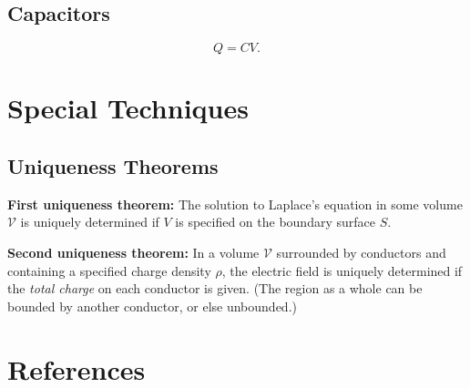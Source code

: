 \documentclass[a4paper]{article}
\numberwithin{equation}{subsection}
\begin{document}
\subsection{Capacitors}

\begin{equation*}
    Q = CV.
\end{equation*}

\medskip
\section{Special Techniques}
\subsection{Uniqueness Theorems}
\textbf{First uniqueness theorem:} The solution to Laplace's equation in some volume $\mathcal{V}$ is uniquely determined if $V$ is specified on the boundary surface $S$.

\textbf{Second uniqueness theorem:} In a volume $\mathcal{V}$ surrounded by conductors and containing a specified charge density $\rho$, the electric field is uniquely determined if the \textit{total charge} on each conductor is given. (The region as a whole can be bounded by another conductor, or else unbounded.)\cite{Griffiths:611579}


\newpage
\section*{References}
%
\printbibliography
[heading = none]
\end{document}
